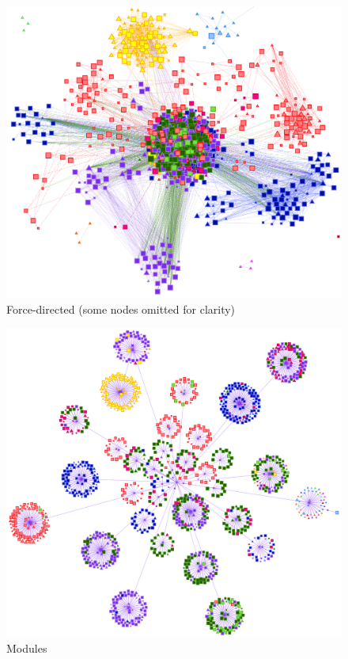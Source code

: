 \begin{figure}[p]
\centering
\includegraphics[height=0.45\textheight]{img/oot/direct}
\caption{Force-directed (some nodes omitted for clarity)}\label{fig:oot:direct}
\end{figure}

\begin{figure}[p]
\centering
\includegraphics[height=0.45\textheight]{img/oot/modules}
\caption{Modules}\label{fig:oot:module}
\end{figure}


